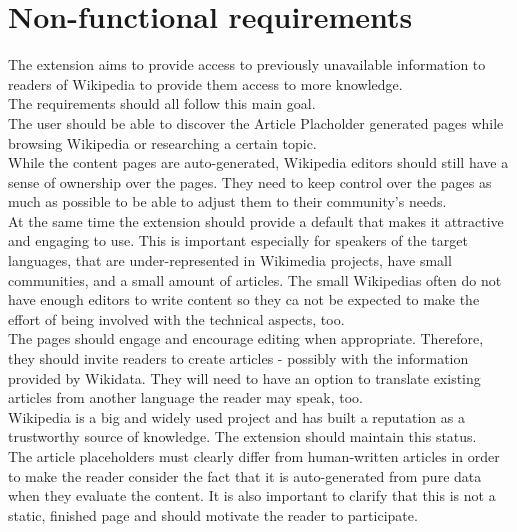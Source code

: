 \chapter{Non-functional requirements}

The extension aims to provide access to previously unavailable information to readers of Wikipedia to provide them access to more knowledge. \\
The requirements should all follow this main goal. \\
The user should be able to discover the Article Placholder generated pages while browsing Wikipedia or researching a certain topic. \\
While the content pages are auto-generated, Wikipedia editors should still have a sense of ownership over the pages. They need to keep control over the pages as much as possible to be able to adjust them to their community's needs. \\
At the same time the extension should provide a default that makes it attractive and engaging to use. This is important especially for speakers of the target languages, that are under-represented in Wikimedia projects, have small communities, and a small amount of articles. The small Wikipedias often do not have enough editors to write content so they ca not be expected to make the effort of being involved with the technical aspects, too.  \\
The pages should engage and encourage editing when appropriate. Therefore, they should invite readers to create articles - possibly with the information provided by Wikidata. They will need to have an option to translate existing articles from another language the reader may speak, too. \\
Wikipedia is a big and widely used project and has built a reputation as a trustworthy source of knowledge. The extension should maintain this status. \\
The article placeholders must clearly differ from human-written articles in order to make the reader consider the fact that it is auto-generated from pure data when they evaluate the content. It is also important to clarify that this is not a static, finished page and should motivate the reader to participate. \\